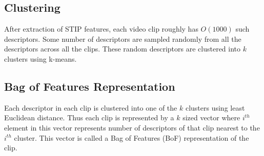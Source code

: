 \subsection{Clustering}
After extraction of STIP features, each video clip roughly has $O(1000)$ such descriptors.
Some number of descriptors are sampled randomly from all the descriptors across all the clips.
These random descriptors are clustered into $k$ clusters using k-means.

\subsection{Bag of Features Representation}
\label{section_BOF}
Each descriptor in each clip is clustered into one of the $k$ clusters using
least Euclidean distance. Thus each clip is represented by a $k$ sized vector
where $i^{th}$ element in this vector represents number of descriptors of that clip 
nearest to the $i^{th}$ cluster. This vector is called a Bag of Features (BoF)
representation of the clip.

\begin{comment}
\begin{table}[t]
\centering
\begin{tabular}{| l | c |}
\hline
{\bf Activity Class} & {\bf Average Precision} \\ \hline
%
AnswerPhone & 11.36\% \\ \hline
DriveCar & 66.96\% \\ \hline
Eat & 45.45\% \\ \hline
FightPerson & 57.63\% \\ \hline
GetOutCar & 17.86\% \\ \hline
HandShake & 25.93\% \\ \hline
HugPerson & 15.15\% \\ \hline
Kiss & 18.18\% \\ \hline
Run & 38.78\% \\ \hline
SitDown & 40.96\% \\ \hline
SitUp & 5.26\% \\ \hline
StandUp & 35.20\% \\ \hline
Average AP & 31.56\% \\ \hline
%
\end{tabular}
\caption{Average precision for classification using only video features}
\label{table:AP_OnlyAction}
\end{table}
\end{comment}


